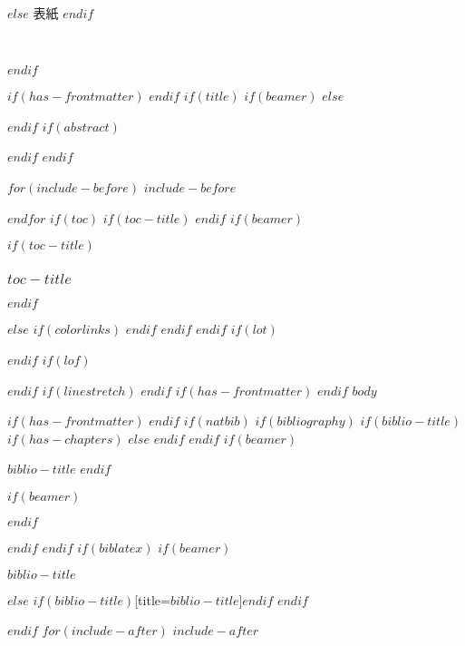 $else$
表紙
$endif$

\clearpage
\clearpage

$endif$


$if(has-frontmatter)$
\frontmatter
$endif$
$if(title)$
$if(beamer)$
\frame{\titlepage}
$else$
\maketitle
$endif$
$if(abstract)$
\begin{abstract}
$abstract$
\end{abstract}
$endif$
$endif$

\clearpage  %

\pagestyle{headings}

$for(include-before)$
$include-before$

$endfor$
$if(toc)$
$if(toc-title)$
\renewcommand*\contentsname{$toc-title$}
$endif$
$if(beamer)$
\begin{frame}
$if(toc-title)$
  \frametitle{$toc-title$}
$endif$
  \tableofcontents[hideallsubsections]
\end{frame}
$else$
{
$if(colorlinks)$
\hypersetup{linkcolor=$if(toccolor)$$toccolor$$else$$endif$}
$endif$
\setcounter{tocdepth}{$toc-depth$}
\tableofcontents
}
$endif$
$endif$
$if(lot)$
\listoftables
$endif$
$if(lof)$
\listoffigures
$endif$
$if(linestretch)$
$endif$
$if(has-frontmatter)$
\mainmatter
$endif$
$body$

$if(has-frontmatter)$
\backmatter
$endif$
$if(natbib)$
$if(bibliography)$
$if(biblio-title)$
$if(has-chapters)$
\renewcommand\bibname{$biblio-title$}
$else$
\renewcommand\refname{$biblio-title$}
$endif$
$endif$
$if(beamer)$
\begin{frame}[allowframebreaks]{$biblio-title$}
  \bibliographytrue
$endif$
  
$if(beamer)$
\end{frame}
$endif$

$endif$
$endif$
$if(biblatex)$
$if(beamer)$
\begin{frame}[allowframebreaks]{$biblio-title$}
  \bibliographytrue
  \printbibliography[heading=none]
\end{frame}
$else$
\printbibliography$if(biblio-title)$[title=$biblio-title$]$endif$
$endif$

$endif$
$for(include-after)$
$include-after$

